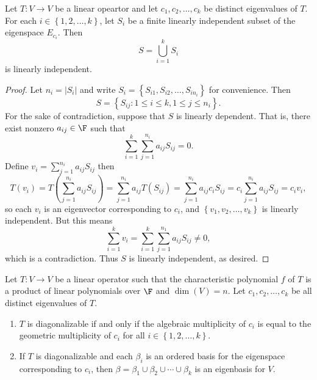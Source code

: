 \documentclass[linearalgebra]{subfiles}
\begin{document}
    \begin{prop}{}
        Let $T:V\to V$ be a linear opeartor and let $c_1, c_2, \ldots, c_k$ be distinct eigenvalues of $T$. For each $i\in \left\lbrace 1, 2, \ldots, k \right\rbrace$, let $S_i$ be a finite linearly independent subset of the eigenspace $E_{c_i}$. Then
        \begin{equation*}
            S = \bigcup^{k}_{i=1} S_i
        \end{equation*}
        is linearly independent.
    \end{prop}

    \begin{proof}
        Let $n_i = |S_i|$ and write $S_i = \left\lbrace S_{i1}, S_{i2}, \ldots, S_{in_i} \right\rbrace$ for convenience. Then
        \begin{equation*}
            S = \left\lbrace S_{ij}: 1\leq i\leq k, 1\leq j\leq n_i \right\rbrace.
        \end{equation*}
        For the sake of contradiction, suppose that $S$ is linearly dependent. That is, there exist nonzero $a_{ij}\in\F$ such that
        \begin{equation*}
            \sum^k_{i=1} \sum^{n_i}_{j=1} a_{ij}S_{ij} = 0.
        \end{equation*}
        Define $v_i = \sum^{n_i}_{j=1} a_{ij}S_{ij}$ then
        \begin{equation*}
            T \left( v_i \right) = T \left( \sum^{n_i}_{j=1} a_{ij}S_{ij} \right) = \sum^{n_i}_{j=1} a_{ij} T \left( S_{ij} \right) = \sum^{n_i}_{j=1} a_{ij}c_iS_{ij} = c_i \sum^{n_i}_{j=1} a_{ij}S_{ij} = c_iv_i,
        \end{equation*}
        so each $v_i$ is an eigenvector corresponding to $c_i$, and $\left\lbrace v_1, v_2, \ldots, v_k \right\rbrace$ is linearly independent. But this means
        \begin{equation*}
            \sum^k_{i=1} v_i = \sum^k_{i=1} \sum^{n_1}_{j=1} a_{ij}S_{ij} \neq 0,
        \end{equation*}
        which is a contradiction. Thus $S$ is linearly independent, as desired.
    \end{proof}

    \begin{prop}{}
        Let $T:V\to V$ be a linear operator such that the characteristic polynomial $f$ of $T$ is a product of linear polynomials over $\F$ and $\dim(V) = n$. Let $c_1, c_2, \ldots, c_k$ be all distinct eigenvalues of $T$.

        \begin{enumerate}
            \item $T$ is diagonalizable if and only if the algebraic multiplicity of $c_i$ is equal to the geometric multiplicity of $c_i$ for all $i\in \left\lbrace 1, 2, \ldots, k \right\rbrace$.
            \item If $T$ is diagonalizable and each $\beta_i$ is an ordered basis for the eigenspace corresponding to $c_i$, then $\beta = \beta_1\cup\beta_2\cup\cdots\cup\beta_k$ is an eigenbasis for $V$.
        \end{enumerate}
    \end{prop}
\end{document}
